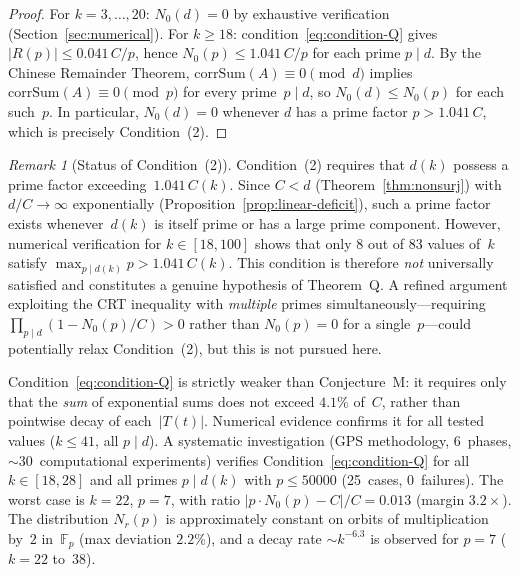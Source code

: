 \documentclass[12pt, a4paper]{amsart}
\theoremstyle{plain}
\theoremstyle{definition}
\theoremstyle{remark}
\newtheorem{remark}[theorem]{Remark}
\newcommand{\Fp}{\mathbb{F}_p}
\newcommand{\corrSum}{\mathrm{corrSum}}
\begin{document}
\begin{proof}
  For $k = 3, \ldots, 20$: $N_0(d) = 0$ by exhaustive
  verification (Section~\ref{sec:numerical}).
  For $k \geq 18$:
  condition~\eqref{eq:condition-Q} gives
  $|R(p)| \leq 0.041\,C/p$, hence
  $N_0(p) \leq 1.041\,C/p$ for each prime $p \mid d$.
  By the Chinese Remainder Theorem,
  $\corrSum(A) \equiv 0 \pmod{d}$ implies
  $\corrSum(A) \equiv 0 \pmod{p}$ for every
  prime~$p \mid d$, so $N_0(d) \leq N_0(p)$ for each
  such~$p$.
  In particular, $N_0(d) = 0$ whenever $d$ has a prime
  factor $p > 1.041\,C$, which is precisely
  Condition~(2).
\end{proof}

\begin{remark}[Status of Condition~(2)]\label{rem:condition-2-status}
  Condition~(2) requires that $d(k)$ possess a prime
  factor exceeding~$1.041\,C(k)$.
  Since $C < d$ (Theorem~\ref{thm:nonsurj}) with
  $d/C \to \infty$ exponentially
  (Proposition~\ref{prop:linear-deficit}), such a prime
  factor exists whenever~$d(k)$ is itself prime or has
  a large prime component.
  However, numerical verification for
  $k \in [18, 100]$ shows that only $8$ out of $83$
  values of~$k$ satisfy
  $\max_{p \mid d(k)} p > 1.041\,C(k)$.
  This condition is therefore \emph{not} universally
  satisfied and constitutes a genuine hypothesis of
  Theorem~Q.
  A refined argument exploiting the CRT inequality
  with \emph{multiple} primes simultaneously---requiring
  $\prod_{p \mid d} (1 - N_0(p)/C) > 0$ rather than
  $N_0(p) = 0$ for a single~$p$---could potentially
  relax Condition~(2), but this is not pursued here.
\end{remark}

Condition~\eqref{eq:condition-Q} is strictly weaker than
Conjecture~M: it requires only that the \emph{sum} of
exponential sums does not exceed $4.1\%$ of~$C$, rather
than pointwise decay of each~$|T(t)|$.
Numerical evidence confirms it for all tested
values ($k \leq 41$, all $p \mid d$).
A systematic investigation (GPS methodology, 6~phases,
${\sim}30$~computational experiments) verifies
Condition~\eqref{eq:condition-Q} for all $k \in [18, 28]$
and all primes $p \mid d(k)$ with $p \leq 50000$ (25~cases,
0~failures). The worst case is $k = 22$, $p = 7$, with ratio
$|p \cdot N_0(p) - C|/C = 0.013$ (margin $3.2\times$). The
distribution $N_r(p)$ is approximately constant on orbits of
multiplication by~$2$ in~$\Fp$ (max deviation $2.2\%$), and a
decay rate $\sim k^{-6.3}$ is observed for $p = 7$ ($k = 22$
to~$38$).
\end{document}
